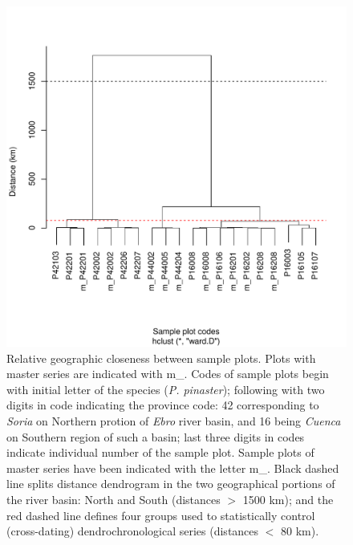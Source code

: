 \documentclass[review,authoryear]{elsarticle}
\begin{document}
\clearpage
\begin{figure}\centering
\includegraphics[scale=0.8,trim=20mm 0mm 20mm 0mm]{clust} 
\caption{Relative geographic closeness between sample plots. Plots with
  master series are indicated with m\_. Codes of sample plots begin with
  initial letter of the species (\textit{P. pinaster}); following with
  two digits in code indicating the province code: 42 corresponding to
  \textit{Soria} on Northern protion of \textit{Ebro} river basin, and
  16 being \textit{Cuenca} on Southern region of such a basin; last
  three digits in codes indicate individual number of the sample
  plot. Sample plots of master series have been indicated with the
  letter m\_. Black dashed line splits distance dendrogram in the two
  geographical portions of the river basin: North and South (distances
  $>$ 1500 km); and the red dashed line defines four groups used to
  statistically control (cross-dating) dendrochronological series
  (distances $<$ 80 km).}
\label{fig:clust} 
\end{figure}
\end{document}
